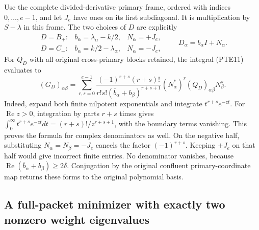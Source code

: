 Use the complete divided-derivative primary frame, ordered with
indices \(0,\ldots,e-1\), and let \(J_e\) have ones on its first
subdiagonal.  It is multiplication by \(S-\lambda\) in this frame.
The two choices of \(D\) are explicitly
\begin{equation}\tag{PTE13}\label{eq:pte13}
 \begin{array}{lll}
 D=B_+:& b_\alpha=\lambda_\alpha-k/2,&N_\alpha=+J_e,\\
 D=C_-:& b_\alpha=k/2-\lambda_\alpha,&N_\alpha=-J_e,
 \end{array}
 \qquad D_\alpha=b_\alpha I+N_\alpha.
\end{equation}
For \(Q_D\) with all original cross-primary blocks retained, the
integral (PTE11) evaluates to
\begin{equation}\tag{PTE14}\label{eq:pte14}
 (G_D)_{\alpha\beta}
 =\sum_{r,s=0}^{e-1}
 \frac{(-1)^{r+s}(r+s)!}
 {r!s!(\overline b_\alpha+b_\beta)^{r+s+1}}
 (N_\alpha^*)^r(Q_D)_{\alpha\beta}N_\beta^s.
\end{equation}
Indeed, expand both finite nilpotent exponentials and integrate
\(t^{r+s}e^{-zt}\).  For \(\operatorname{Re}z>0\), integration by
parts \(r+s\) times gives
\(\int_0^\infty t^{r+s}e^{-zt}dt=(r+s)!/z^{r+s+1}\), with the
boundary terms vanishing.  This proves the formula for complex
denominators as well.  On the negative half, substituting
\(N_\alpha=N_\beta=-J_e\) cancels the factor \((-1)^{r+s}\).
Keeping \(+J_e\) on that half would give incorrect finite entries.
No denominator vanishes, because
\(\operatorname{Re}(\overline b_\alpha+b_\beta)\geq2\delta\).
Conjugation by the original confluent primary-coordinate map returns
these forms to the original polynomial basis.

\subsection{A full-packet minimizer with exactly two nonzero weight eigenvalues}

